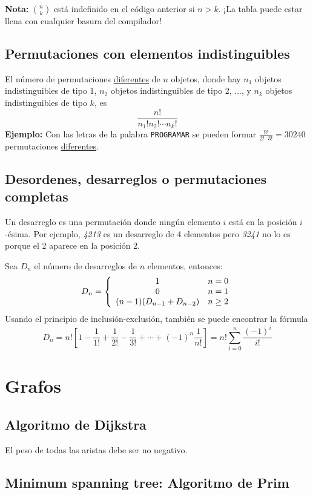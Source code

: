 \documentclass[10pt,letterpaper]{article}
\begin{document}
\bigskip 
\textbf{Nota:} $ \displaystyle {n \choose k }  $ está indefinido en el código anterior si $ n > k$. ¡La tabla puede estar llena con cualquier basura del compilador!

\subsection{Permutaciones con elementos indistinguibles}
El número de permutaciones \underline{diferentes} de $n$ objetos, donde hay $n_{1}$ objetos indistinguibles de tipo 1,
$n_{2}$ objetos indistinguibles de tipo 2, ..., y $n_{k}$ objetos indistinguibles de tipo $k$, es
$$
\frac{n!}{n_{1}!n_{2}! \cdots n_{k}!}
$$
\textbf{Ejemplo:} Con las letras de la palabra \texttt{PROGRAMAR} se pueden formar $ \displaystyle \frac{9!}{2! \cdot 3!} = 
30240 $ permutaciones \underline{diferentes}.
\subsection{Desordenes, desarreglos o permutaciones completas}

Un desarreglo es una permutación donde ningún elemento $i$ está en la
posición $i$-ésima. Por ejemplo, \textit{4213} es un desarreglo de 4 elementos pero
\textit{3241} no lo es porque el 2 aparece en la posición 2.

Sea $D_{n}$ el número de desarreglos de $n$ elementos, entonces:
$$ {D_{n}} = \left\{
\begin{array}{c l}
 1 & n = 0\\
 0 & n = 1\\
 (n-1)(D_{n-1} + D_{n-2}) & n \geq 2\\
\end{array}
\right.
$$
Usando el principio de inclusión-exclusión, también se puede encontrar la fórmula
$$
D_{n} = n!\left [ 1 - \frac{1}{1!} + \frac{1}{2!} - \frac{1}{3!} + \cdots + (-1)^{n}\frac{1}{n!} \right ]
= n! \sum_{i=0}^{n} \frac{(-1)^{i}}{i!}
$$

\section{Grafos}
\subsection{Algoritmo de Dijkstra}
El peso de todas las aristas debe ser no negativo.
\\

\subsection{Minimum spanning tree: Algoritmo de Prim}
\end{document}
